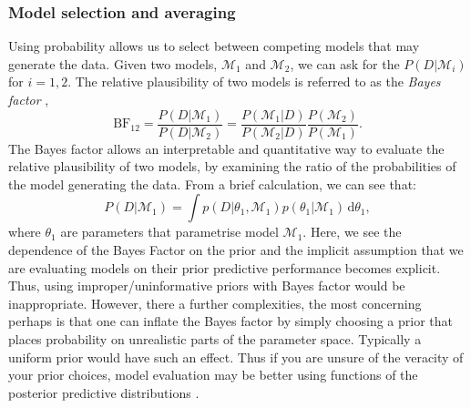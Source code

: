 \documentclass[12pt,english, journal=jpr, layout=twocolumn]{article}
\begin{document}
\subsubsection{Model selection and averaging}
Using probability allows us to select between competing models that may generate the data. Given two models, $\mathcal{M}_1$ and $\mathcal{M}_2$, we can ask for the $P(D| \mathcal{M}_i)$ for $i = 1,2$. The relative plausibility of two models is referred to as the \textit{Bayes factor} \citep{Kass::1995},
\begin{equation}
\text{BF}_{12} = \frac{P(D|\mathcal{M}_1)}{P(D|\mathcal{M}_2)} = \frac{P(\mathcal{M}_1|D)}{P(\mathcal{M}_2|D)}\frac{P(\mathcal{M}_2)}{P(\mathcal{M}_1)}. 
\end{equation}   
The Bayes factor allows an interpretable and quantitative way to evaluate the relative plausibility of two models, by examining the ratio of the probabilities of the model generating the data. From a brief calculation, we can see that:
\begin{equation}
P(D|\mathcal{M}_1) = \int p(D|\theta_1, \mathcal{M}_1)p(\theta_1|\mathcal{M}_1)\, \text{d}\theta_1,
\end{equation}   
where $\theta_1$ are parameters that parametrise model $\mathcal{M}_1$. Here, we see the dependence of the Bayes Factor on the prior and the implicit assumption that we are evaluating models on their prior predictive performance becomes explicit. Thus, using improper/uninformative priors with Bayes factor would be inappropriate. However, there a further complexities, the most concerning perhaps is that one can inflate the Bayes factor by simply choosing a prior that places probability on unrealistic parts of the parameter space. Typically a uniform prior would have such an effect. Thus if you are unsure of the veracity of your prior choices, model evaluation may be better using functions of the posterior predictive distributions \citep{Betancourt::2021}. 
\end{document}
